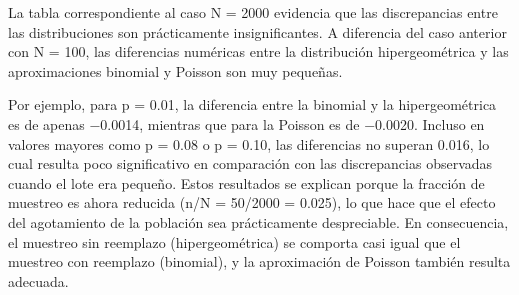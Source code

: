 \documentclass[
  12pt,
]{article}
\begin{document}
\begin{table}[!h]
\centering
\caption{\label{tab:plan24}Comparación de probabilidades de aceptación (N = 2000, n = 50, c = 2)}
\centering
{}
\end{table}

La tabla correspondiente al caso N = 2000 evidencia que las
discrepancias entre las distribuciones son prácticamente
insignificantes. A diferencia del caso anterior con N = 100, las
diferencias numéricas entre la distribución hipergeométrica y las
aproximaciones binomial y Poisson son muy pequeñas.

Por ejemplo, para p = 0.01, la diferencia entre la binomial y la
hipergeométrica es de apenas −0.0014, mientras que para la Poisson es de
−0.0020. Incluso en valores mayores como p = 0.08 o p = 0.10, las
diferencias no superan 0.016, lo cual resulta poco significativo en
comparación con las discrepancias observadas cuando el lote era pequeño.
Estos resultados se explican porque la fracción de muestreo es ahora
reducida (n/N = 50/2000 = 0.025), lo que hace que el efecto del
agotamiento de la población sea prácticamente despreciable. En
consecuencia, el muestreo sin reemplazo (hipergeométrica) se comporta
casi igual que el muestreo con reemplazo (binomial), y la aproximación
de Poisson también resulta adecuada.
\end{document}
